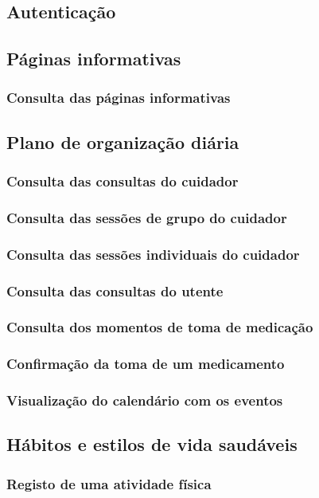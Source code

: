 \subsection{Autenticação}
\subsection{Páginas informativas}
\subsubsection{Consulta das páginas informativas}
\subsection{Plano de organização diária}
\subsubsection{Consulta das consultas do cuidador}
\subsubsection{Consulta das sessões de grupo do cuidador}
\subsubsection{Consulta das sessões individuais do cuidador}
\subsubsection{Consulta das consultas do utente}
\subsubsection{Consulta dos momentos de toma de medicação}
\subsubsection{Confirmação da toma de um medicamento}
\subsubsection{Visualização do calendário com os eventos}
\subsection{Hábitos e estilos de vida saudáveis}
\subsubsection{Registo de uma atividade física}
